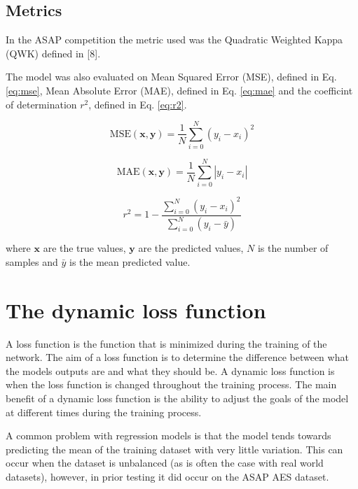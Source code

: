 \hypertarget{metrics}{%
\subsection{Metrics}\label{metrics}}

In the ASAP competition the metric used was the Quadratic Weighted Kappa
(QWK) defined in {[}8{]}.

The model was also evaluated on Mean Squared Error (MSE), defined in Eq.
\ref{eq:mse}, Mean Absolute Error (MAE), defined in Eq. \ref{eq:mae} and
the coefficint of determination \(r^2\), defined in Eq. \ref{eq:r2}.

\begin{equation} \text{MSE}(\mathbf{x}, \mathbf{y}) = \frac{1}{N} \sum^{N}_{i=0} (y_i-x_i)^2 \label{eq:mse}\end{equation}

\begin{equation} \text{MAE}(\mathbf{x}, \mathbf{y}) = \frac{1}{N} \sum^N_{i=0} |y_i-x_i| \label{eq:mae}\end{equation}

\begin{equation} r^2 = 1-\frac{\sum^N_{i=0} (y_i-x_i)^2}{\sum^N_{i=0} (y_i-\bar{y})} \label{eq:r2}\end{equation}

where \(\mathbf{x}\) are the true values, \(\mathbf{y}\) are the
predicted values, \(N\) is the number of samples and \(\bar{y}\) is the
mean predicted value.

\hypertarget{the-dynamic-loss-function}{%
\section{The dynamic loss function}\label{the-dynamic-loss-function}}

A loss function is the function that is minimized during the training of
the network. The aim of a loss function is to determine the difference
between what the models outputs are and what they should be. A dynamic
loss function is when the loss function is changed throughout the
training process. The main benefit of a dynamic loss function is the
ability to adjust the goals of the model at different times during the
training process.

A common problem with regression models is that the model tends towards
predicting the mean of the training dataset with very little variation.
This can occur when the dataset is unbalanced (as is often the case with
real world datasets), however, in prior testing it did occur on the ASAP
AES dataset.

